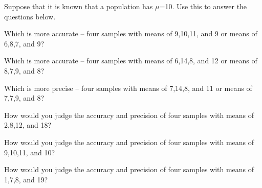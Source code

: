 \documentclass[10pt,openany]{book}\usepackage[]{graphicx}\usepackage[]{color}
\begin{document}
\begin{exsection}
  \item \label{revex:SamplingDistPA} Suppose that it is known that a population has $\mu$=10. Use this to answer the questions below. 
  \begin{Enumerate}
    \item Which is more accurate -- four samples with means of 9,10,11, and 9 or means of 6,8,7, and 9?
    \item Which is more accurate -- four samples with means of 6,14,8, and 12 or means of 8,7,9, and 8?
    \item Which is more precise -- four samples with means of 7,14,8, and 11 or means of 7,7,9, and 8?
    \item How would you judge the accuracy and precision of four samples with means of 2,8,12, and 18?
    \item How would you judge the accuracy and precision of four samples with means of 9,10,11, and 10?
    \item How would you judge the accuracy and precision of four samples with means of 1,7,8, and 19?
  \end{Enumerate}
\end{exsection}










%    
\end{document}
